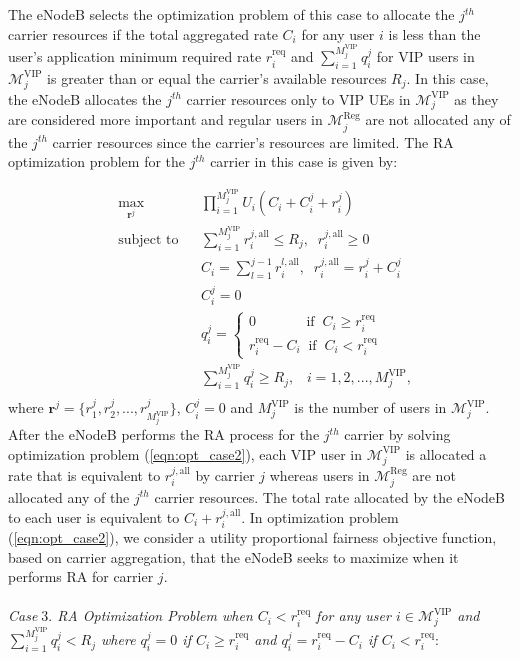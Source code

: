 \documentclass[journal]{IEEEtran} 				\IEEEoverridecommandlockouts 						\usepackage{amsmath,amssymb}
\begin{document}
The eNodeB selects the optimization problem of this case to allocate the $j^{th}$ carrier resources if the total aggregated rate $C_i$ for any user $i$ is less than the user's application minimum required rate $r_i^{\text{req}}$ and $\sum_{i=1}^{M_j^{\text{VIP}}}q_i^j$ for VIP users in $\mathcal{M}_j^{\text{VIP}}$ is greater than or equal the carrier's available resources $R_j$. In this case, the eNodeB allocates the $j^{th}$ carrier resources only to VIP UEs in $\mathcal{M}_j^{\text{VIP}}$ as they are considered more important and regular users in $\mathcal{M}_j^{\text{Reg}}$ are not allocated any of the $j^{th}$ carrier resources since the carrier's resources are limited. The RA optimization problem for the $j^{th}$ carrier in this case is given by:

\begin{equation}\label{eqn:opt_case2}
\begin{aligned}
& \underset{\textbf{r}^j}{\text{max}}
& & \prod_{i=1}^{M_j^{\text{VIP}}}U_i(C_i+C_i^j+r_i^j) \\
& \text{subject to}
& & \sum_{i=1}^{M_j^{\text{VIP}}}r_i^{j,\text{all}} \leq R_j,\;\;r_i^{j,\text{all}} \geq 0\\
& & & C_i=\sum_{l=1}^{j-1}r_i^{l,\text{all}},\;\;r_i^{j,\text{all}}=r_i^j+C_i^j\\
& & & C_i^j=0\\
& & & q_i^j=
\begin{cases}
	0 \;\;\;\;\;\;\;\;\;\;\;\;\; \text{if}\;\; C_i \geq r_i^{\text{req}}\\
	r_i^{\text{req}}-C_i \;\;\text{if}\;\; C_i < r_i^{\text{req}}
\end{cases}\\
& & & \sum_{i=1}^{M_j^{\text{VIP}}}q_i^j \geq R_j, \;\;\; i = 1,2, ...,M_j^{\text{VIP}},\\
\end{aligned}
\end{equation}
where $\textbf{r}^j =\{r_1^j,r_2^j,...,r_{M_j^{\text{VIP}}}^j\}$, $C_i^j=0$ and $M_j^{\text{VIP}}$ is the number of users in $\mathcal{M}_j^{\text{VIP}}$. After the eNodeB performs the RA process for the $j^{th}$ carrier by solving optimization problem (\ref{eqn:opt_case2}), each VIP user in $\mathcal{M}_j^{\text{VIP}}$ is allocated a rate that is equivalent to $r_i^{j,\text{all}}$ by carrier $j$ whereas users in $\mathcal{M}_j^{\text{Reg}}$ are not allocated any of the $j^{th}$ carrier resources. The total rate allocated by the eNodeB to each user is equivalent to $C_i+r_i^{j,\text{all}}$. In optimization problem (\ref{eqn:opt_case2}), we consider a utility proportional fairness objective function, based on carrier aggregation, that the eNodeB seeks to maximize when it performs RA for carrier $j$.\\
\\\textit{Case$\;3.$ RA Optimization Problem when $C_i < r_i^{\text{req}}$ for any user $i \in \mathcal{M}_j^{\text{VIP}}$ and $\sum_{i=1}^{M_j^{\text{VIP}}} q_i^j < R_j$ where $q_i^j=0$ if $C_i \geq r_i^{\text{req}}$ and $q_i^j=r_i^{\text{req}}-C_i$ if $C_i < r_i^{\text{req}}$}:
\end{document}
